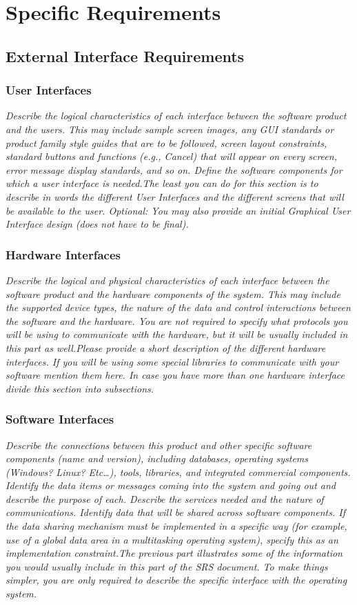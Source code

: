 
\section{Specific Requirements}
    \subsection{External Interface Requirements}
        \subsubsection{User Interfaces}
            \emph{Describe the logical characteristics of each interface between the software product and the users. This may include sample screen images, any GUI standards or product family style guides that are to be followed, screen layout constraints, standard buttons and functions (e.g., Cancel) that will appear on every screen, error message display standards, and so on. Define the software components for which a user interface is needed.\gnl The least you can do for this section is to describe in words the different User Interfaces and the different screens that will be available to the user. Optional: You may also provide an initial Graphical User Interface design (does not have to be final).}
        \subsubsection{Hardware Interfaces}
            \emph{Describe the logical and physical characteristics of each interface between the software product and the hardware components of the system. This may include the supported device types, the nature of the data and control interactions between the software and the hardware. You are not required to specify what protocols you will be using to communicate with the hardware, but it will be usually included in this part as well.\gnl Please provide a short description of the different hardware interfaces. If you will be using some special libraries to communicate with your software mention them here. In case you have more than one hardware interface divide this section into subsections.}
        \subsubsection{Software Interfaces}
            \emph{Describe the connections between this product and other specific software components (name and version), including databases, operating systems (Windows? Linux? Etc\dots), tools, libraries, and integrated commercial components. Identify the data items or messages coming into the system and going out and describe the purpose of each. Describe the services needed and the nature of communications. Identify data that will be shared across software components. If the data sharing mechanism must be implemented in a specific way (for example, use of a global data area in a multitasking operating system), specify this as an implementation constraint.\gnl The previous part illustrates some of the information you would usually include in this part of the SRS document. To make things simpler, you are only required to describe the specific interface with the operating system.}
